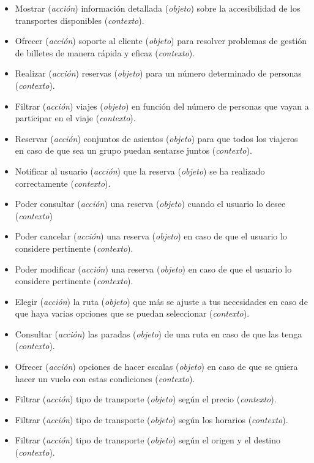 \begin{itemize}
    \item Mostrar (\textit{acción}) información detallada (\textit{objeto}) sobre la accesibilidad de los transportes disponibles (\textit{contexto}).
    \item Ofrecer (\textit{acción}) soporte al cliente (\textit{objeto}) para resolver problemas de gestión de billetes de manera rápida y eficaz (\textit{contexto}).
    \item Realizar (\textit{acción}) reservas (\textit{objeto}) para un número determinado de personas (\textit{contexto}).
    \item Filtrar (\textit{acción}) viajes (\textit{objeto}) en función del número de personas que vayan a participar en el viaje (\textit{contexto}).
    \item Reservar (\textit{acción}) conjuntos de asientos (\textit{objeto}) para que todos los viajeros en caso de que sea un grupo puedan sentarse juntos (\textit{contexto}).
    \item Notificar al usuario (\textit{acción}) que la reserva (\textit{objeto}) se ha realizado correctamente (\textit{contexto}).
    \item Poder consultar (\textit{acción}) una reserva (\textit{objeto}) cuando el usuario lo desee (\textit{contexto})
    \item Poder cancelar (\textit{acción}) una reserva (\textit{objeto}) en caso de que el usuario lo considere pertinente (\textit{contexto}).
    \item Poder modificar (\textit{acción}) una reserva (\textit{objeto}) en caso de que el usuario lo considere pertinente (\textit{contexto}).
    \item Elegir (\textit{acción}) la ruta (\textit{objeto}) que más se ajuste a tus necesidades en caso de que haya varias opciones que se puedan seleccionar (\textit{contexto}).
    \item Consultar (\textit{acción}) las paradas (\textit{objeto}) de una ruta en caso de que las tenga (\textit{contexto}).
    \item Ofrecer (\textit{acción}) opciones de hacer escalas (\textit{objeto}) en caso de que se quiera hacer un vuelo con estas condiciones (\textit{contexto}).
    \item Filtrar (\textit{acción}) tipo de transporte (\textit{objeto}) según el precio (\textit{contexto}).
    \item Filtrar (\textit{acción}) tipo de transporte (\textit{objeto}) según los horarios (\textit{contexto}).
    \item Filtrar (\textit{acción}) tipo de transporte (\textit{objeto}) según el origen y el destino (\textit{contexto}).

\end{itemize}
